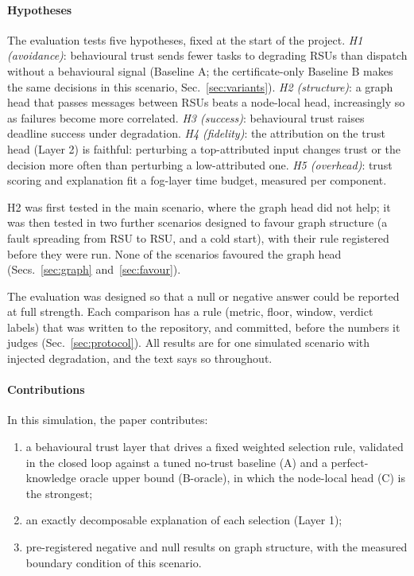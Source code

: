 \paragraph*{Hypotheses}
The evaluation tests five hypotheses, fixed at the start of the project.
\emph{H1 (avoidance)}: behavioural trust sends fewer tasks to degrading RSUs than dispatch without a behavioural signal (Baseline A; the certificate-only Baseline B makes the same decisions in this scenario, Sec.~\ref{sec:variants}).
\emph{H2 (structure)}: a graph head that passes messages between RSUs beats a node-local head, increasingly so as failures become more correlated.
\emph{H3 (success)}: behavioural trust raises deadline success under degradation.
\emph{H4 (fidelity)}: the attribution on the trust head (Layer 2) is faithful: perturbing a top-attributed input changes trust or the decision more often than perturbing a low-attributed one.
\emph{H5 (overhead)}: trust scoring and explanation fit a fog-layer time budget, measured per component.

H2 was first tested in the main scenario, where the graph head did not help; it was then tested in two further scenarios designed to favour graph structure (a fault spreading from RSU to RSU, and a cold start), with their rule registered before they were run.
None of the scenarios favoured the graph head (Secs.~\ref{sec:graph} and~\ref{sec:favour}).

The evaluation was designed so that a null or negative answer could be reported at full strength.
Each comparison has a rule (metric, floor, window, verdict labels) that was written to the repository, and committed, before the numbers it judges (Sec.~\ref{sec:protocol}).
All results are for one simulated scenario with injected degradation, and the text says so throughout.

\paragraph*{Contributions}
In this simulation, the paper contributes:
\begin{enumerate}
\item a behavioural trust layer that drives a fixed weighted selection rule, validated in the closed loop against a tuned no-trust baseline (A) and a perfect-knowledge oracle upper bound (B-oracle), in which the node-local head (C) is the strongest;
\item an exactly decomposable explanation of each selection (Layer 1);
\item pre-registered negative and null results on graph structure, with the measured boundary condition of this scenario.
\end{enumerate}

